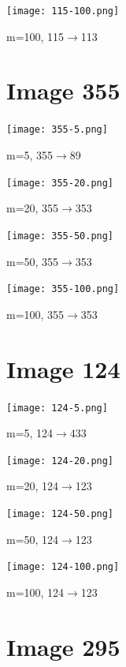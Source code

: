 \documentclass{article}
\begin{document}
\begin{center}
    \texttt{[image: 115-100.png]}
    \caption{m=100, 115$\rightarrow$113}
\end{center}

\section{Image 355}

\begin{center}
    \texttt{[image: 355-5.png]}
    \caption{m=5, 355$\rightarrow$89}
\end{center}

\begin{center}
    \texttt{[image: 355-20.png]}
    \caption{m=20, 355$\rightarrow$353}
\end{center}

\begin{center}
    \texttt{[image: 355-50.png]}
    \caption{m=50, 355$\rightarrow$353}
\end{center}

\begin{center}
    \texttt{[image: 355-100.png]}
    \caption{m=100, 355$\rightarrow$353}
\end{center}

\section{Image 124}

\begin{center}
    \texttt{[image: 124-5.png]}
    \caption{m=5, 124$\rightarrow$433}
\end{center}

\begin{center}
    \texttt{[image: 124-20.png]}
    \caption{m=20, 124$\rightarrow$123}
\end{center}

\begin{center}
    \texttt{[image: 124-50.png]}
    \caption{m=50, 124$\rightarrow$123}
\end{center}

\begin{center}
    \texttt{[image: 124-100.png]}
    \caption{m=100, 124$\rightarrow$123}
\end{center}

\section{Image 295}
\end{document}
